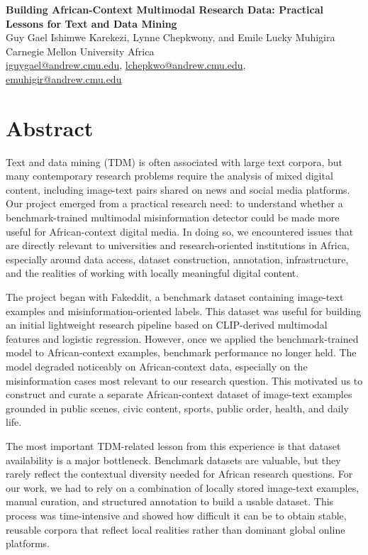 \documentclass[11pt]{article}
\begin{document}
\begin{center}
{\LARGE \textbf{Building African-Context Multimodal Research Data: Practical Lessons for Text and Data Mining}}\\[1em]
{\large Guy Gael Ishimwe Karekezi, Lynne Chepkwony, and Emile Lucky Muhigira}\\[0.5em]
Carnegie Mellon University Africa\\
\href{mailto:iguygael@andrew.cmu.edu}{iguygael@andrew.cmu.edu},
\href{mailto:lchepkwo@andrew.cmu.edu}{lchepkwo@andrew.cmu.edu},
\href{mailto:emuhigir@andrew.cmu.edu}{emuhigir@andrew.cmu.edu}
\end{center}

\section*{Abstract}
Text and data mining (TDM) is often associated with large text corpora, but many contemporary research problems require the analysis of mixed digital content, including image-text pairs shared on news and social media platforms. Our project emerged from a practical research need: to understand whether a benchmark-trained multimodal misinformation detector could be made more useful for African-context digital media. In doing so, we encountered issues that are directly relevant to universities and research-oriented institutions in Africa, especially around data access, dataset construction, annotation, infrastructure, and the realities of working with locally meaningful digital content.

The project began with Fakeddit, a benchmark dataset containing image-text examples and misinformation-oriented labels. This dataset was useful for building an initial lightweight research pipeline based on CLIP-derived multimodal features and logistic regression. However, once we applied the benchmark-trained model to African-context examples, benchmark performance no longer held. The model degraded noticeably on African-context data, especially on the misinformation cases most relevant to our research question. This motivated us to construct and curate a separate African-context dataset of image-text examples grounded in public scenes, civic content, sports, public order, health, and daily life.

The most important TDM-related lesson from this experience is that dataset availability is a major bottleneck. Benchmark datasets are valuable, but they rarely reflect the contextual diversity needed for African research questions. For our work, we had to rely on a combination of locally stored image-text examples, manual curation, and structured annotation to build a usable dataset. This process was time-intensive and showed how difficult it can be to obtain stable, reusable corpora that reflect local realities rather than dominant global online platforms.
\end{document}
